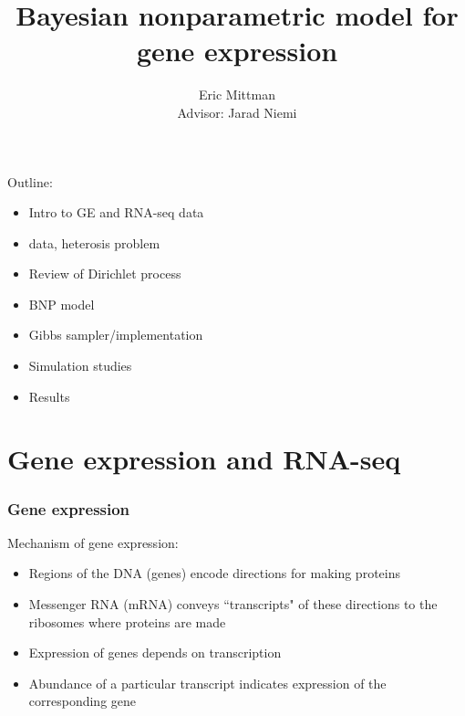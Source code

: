 \documentclass{beamer}
\title{Bayesian nonparametric model for gene expression}
\author{Eric Mittman \\ \vspace{.5cm} Advisor: Jarad Niemi}
\begin{document}
\frame{\titlepage}


\begin{frame}
Outline:
\begin{itemize}
  \item Intro to GE and RNA-seq data
  \item \citet{paschold} data, heterosis problem
  \item Review of Dirichlet process
  \item BNP model
  \item Gibbs sampler/implementation
  \item Simulation studies
  \item Results
\end{itemize}
\end{frame}


\section[GE/RNA-seq]{Gene expression and RNA-seq}

\begin{frame}%
  \frametitle{Gene expression}
  Mechanism of gene expression:
  \begin{itemize}
    \item Regions of the DNA (genes) encode directions for making proteins
    \item Messenger RNA (mRNA) conveys ``transcripts" of these directions to the ribosomes where proteins are made
    \item Expression of genes depends on transcription
    \item Abundance of a particular transcript indicates expression of the corresponding gene
  \end{itemize}
  
  
  {\scriptsize \citep[\textit{Statistical Analysis of Next Generation Sequencing Data}]{datta2014}}
\end{frame}
\end{document}
